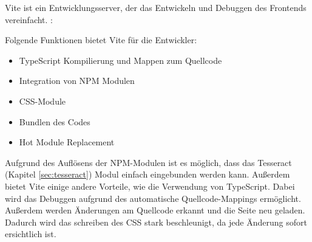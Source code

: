 

Vite ist ein Entwicklungsserver, der das Entwickeln und Debuggen des Frontends vereinfacht. \cite{ViteOverview}:

Folgende Funktionen bietet Vite für die Entwickler:

\begin{itemize}
    \item TypeScript Kompilierung und Mappen zum Quellcode
    \item Integration von NPM Modulen
    \item CSS-Module
    \item Bundlen des Codes
    \item Hot Module Replacement
\end{itemize}




Aufgrund des Auflösens der NPM-Modulen ist es möglich, dass das Tesseract (Kapitel \ref{sec:tesseract}) Modul einfach eingebunden werden kann. 
Außerdem bietet Vite einige andere Vorteile, wie die Verwendung von TypeScript. Dabei wird das Debuggen aufgrund des automatische Quellcode-Mappings ermöglicht. 
Außerdem werden Änderungen am Quellcode erkannt und die Seite neu geladen. Dadurch wird das schreiben des CSS stark beschleunigt, da jede Änderung sofort ersichtlich ist.